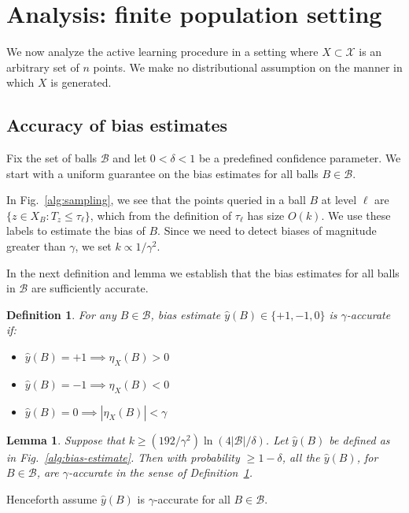 \documentclass[twoside]{article}
\def\X{{\mathcal X}}
\def\B{{\mathcal B}}
\def\yh{{\widehat{y}}}
\newtheorem{lemma}[thm]{Lemma}
\newtheorem{defn}[thm]{Definition}
\begin{document}
\section{Analysis: finite population setting}
\label{sec:discrete}

We now analyze the active learning procedure in a setting where $X \subset \X$ is an arbitrary set of $n$ points. We make no distributional assumption on the manner in which $X$ is generated.

\subsection{Accuracy of bias estimates}

Fix the set of balls $\B$ and let $0 < \delta < 1$ be a
predefined confidence parameter. We start with a uniform guarantee on the
bias estimates for all balls $B \in \B$.

In Fig.~\ref{alg:sampling}, we see that the points queried in a ball $B$ at level $\ell$ are $\{z \in X_B: T_z \leq \tau_\ell\}$, which from the definition of $\tau_\ell$ has size $O(k)$. We use these labels to estimate the bias of $B$. Since we need to detect biases of magnitude greater than $\gamma$, we set $k \propto 1/\gamma^2$. 

In the next definition and lemma we establish that the bias estimates for all balls in $\B$ are sufficiently accurate. 
\begin{defn}
\label{def:accurate-bias-estimate}
For any $B \in \B$, bias estimate $\yh(B) \in \{+1,-1,0\}$ is \emph{$\gamma$-accurate} if:
\begin{itemize}
\item $\yh(B) = +1 \implies \eta_X(B) > 0$
\item $\yh(B) = -1 \implies \eta_X(B) < 0$
\item $\yh(B) = 0 \implies |\eta_X(B)| < \gamma$
\end{itemize}
\end{defn}


\begin{lemma}
\label{lemma:accurate-bias-estimate}
  Suppose that $k \geq (192/\gamma^2) \ln (4 |\B|/\delta)$.  Let
  $\yh(B)$ be defined as in Fig.~\ref{alg:bias-estimate}.  Then with
  probability $\geq 1-\delta$, all the $\yh(B)$, for $B \in \B$, are
  $\gamma$-accurate in the sense of
  Definition~\ref{def:accurate-bias-estimate}.
\end{lemma}
Henceforth assume $\yh(B)$ is $\gamma$-accurate for all  $B \in \B$.
\end{document}
